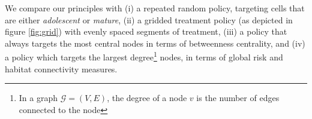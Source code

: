 We compare our principles with (i) a repeated random policy, targeting cells that are either \textit{adolescent} or \textit{mature}, (ii) a gridded treatment policy (as depicted in figure \ref{fig:grid}) with evenly spaced segments of treatment, (iii) a policy that always targets the most central nodes in terms of betweenness centrality, and (iv) a policy which targets the largest degree\footnote{In a graph $\mathcal{G}=(V,E)$, the degree of a node $v$ is the number of edges connected to the node} nodes, in terms of global risk and habitat connectivity measures.
%
%
